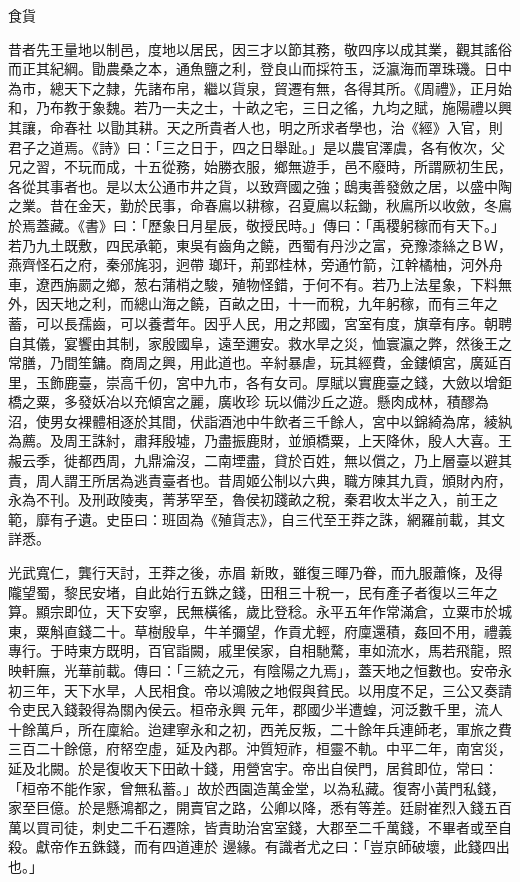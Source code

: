 
\begin{pinyinscope}

 食貨



 昔者先王量地以制邑，度地以居民，因三才以節其務，敬四序以成其業，觀其謠俗而正其紀綱。勖農桑之本，通魚鹽之利，登良山而採符玉，泛瀛海而罩珠璣。日中為市，總天下之隸，先諸布帛，繼以貨泉，貿遷有無，各得其所。《周禮》，正月始和，乃布教于象魏。若乃一夫之士，十畝之宅，三日之徭，九均之賦，施陽禮以興其讓，命春社
 以勖其耕。天之所貴者人也，明之所求者學也，治《經》入官，則君子之道焉。《詩》曰：「三之日于，四之日舉趾。」是以農官澤虞，各有攸次，父兄之習，不玩而成，十五從務，始勝衣服，鄉無遊手，邑不廢時，所謂厥初生民，各從其事者也。是以太公通市井之貨，以致齊國之強；鴟夷善發斂之居，以盛中陶之業。昔在金天，勤於民事，命春鳸以耕稼，召夏鳸以耘鋤，秋鳸所以收斂，冬鳸於焉蓋藏。《書》曰：「歷象日月星辰，敬授民時。」傳曰：「禹稷躬稼而有天下。」若乃九土既敷，四民承範，東吳有齒角之饒，西蜀有丹沙之富，兗豫漆絲之ＢＷ，燕齊怪石之府，秦邠旄羽，迥帶
 瑯玕，荊郢桂林，旁通竹箭，江幹橘柚，河外舟車，遼西旃罽之鄉，葱右蒲梢之駿，殖物怪錯，于何不有。若乃上法星象，下料無外，因天地之利，而總山海之饒，百畝之田，十一而稅，九年躬稼，而有三年之蓄，可以長孺齒，可以養耆年。因乎人民，用之邦國，宮室有度，旗章有序。朝聘自其儀，宴饗由其制，家殷國阜，遠至邇安。救水旱之災，恤寰瀛之弊，然後王之常膳，乃間笙鏞。商周之興，用此道也。辛紂暴虐，玩其經費，金鏤傾宮，廣延百里，玉飾鹿臺，崇高千仞，宮中九市，各有女司。厚賦以實鹿臺之錢，大斂以增鉅橋之粟，多發妖冶以充傾宮之麗，廣收珍
 玩以備沙丘之遊。懸肉成林，積醪為沼，使男女裸體相逐於其間，伏詣酒池中牛飲者三千餘人，宮中以錦綺為席，綾紈為薦。及周王誅紂，肅拜殷墟，乃盡振鹿財，並頒橋粟，上天降休，殷人大喜。王赧云季，徙都西周，九鼎淪沒，二南堙盡，貸於百姓，無以償之，乃上層臺以避其責，周人謂王所居為逃責臺者也。昔周姬公制以六典，職方陳其九貢，頒財內府，永為不刊。及刑政陵夷，菁茅罕至，魯侯初踐畝之稅，秦君收太半之入，前王之範，靡有孑遺。史臣曰：班固為《殖貨志》，自三代至王莽之誅，網羅前載，其文詳悉。



 光武寬仁，龔行天討，王莽之後，赤眉
 新敗，雖復三暉乃眷，而九服蕭條，及得隴望蜀，黎民安堵，自此始行五銖之錢，田租三十稅一，民有產子者復以三年之算。顯宗即位，天下安寧，民無橫徭，歲比登稔。永平五年作常滿倉，立粟市於城東，粟斛直錢二十。草樹殷阜，牛羊彌望，作貢尤輕，府廩還積，姦回不用，禮義專行。于時東方既明，百官詣闕，戚里侯家，自相馳騖，車如流水，馬若飛龍，照映軒廡，光華前載。傳曰：「三統之元，有陰陽之九焉」，蓋天地之恒數也。安帝永初三年，天下水旱，人民相食。帝以鴻陂之地假與貧民。以用度不足，三公又奏請令吏民入錢穀得為關內侯云。桓帝永興
 元年，郡國少半遭蝗，河泛數千里，流人十餘萬戶，所在廩給。迨建寧永和之初，西羌反叛，二十餘年兵連師老，軍旅之費三百二十餘億，府帑空虛，延及內郡。沖質短祚，桓靈不軌。中平二年，南宮災，延及北闕。於是復收天下田畝十錢，用營宮宇。帝出自侯門，居貧即位，常曰：「桓帝不能作家，曾無私蓄。」故於西園造萬金堂，以為私藏。復寄小黃門私錢，家至巨億。於是懸鴻都之，開賣官之路，公卿以降，悉有等差。廷尉崔烈入錢五百萬以買司徒，刺史二千石遷除，皆責助治宮室錢，大郡至二千萬錢，不畢者或至自殺。獻帝作五銖錢，而有四道連於
 邊緣。有識者尤之曰：「豈京師破壞，此錢四出也。」




\end{pinyinscope}
